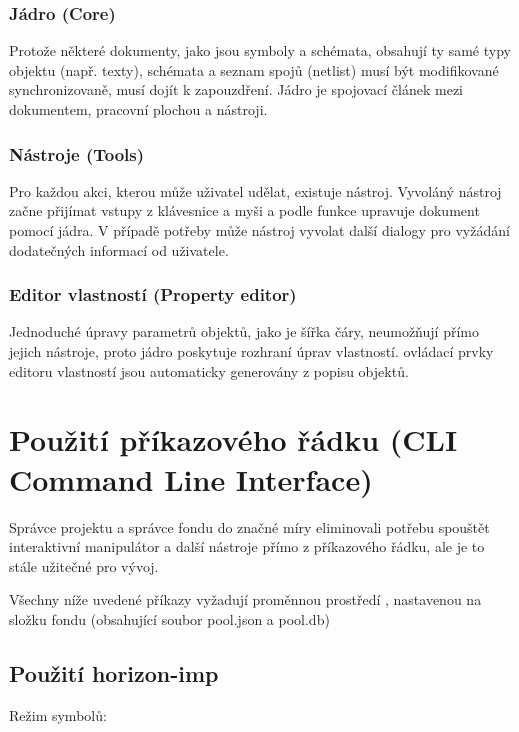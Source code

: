 \documentclass[letterpaper,10pt,czech]{sphinxmanual}
\begin{document}
\subsection{Jádro (Core)}
\label{\detokenize{theory-of-operation:jadro-core}}
Protože některé dokumenty, jako jsou symboly a schémata, obsahují ty samé
typy objektu (např. texty), schémata a seznam spojů (netlist) musí být
modifikované synchronizovaně, musí dojít k zapouzdření. Jádro je
spojovací článek mezi dokumentem, pracovní plochou a nástroji.


\subsection{Nástroje (Tools)}
\label{\detokenize{theory-of-operation:nastroje-tools}}
Pro každou akci, kterou může uživatel udělat, existuje nástroj. Vyvoláný nástroj začne
přijímat vstupy z klávesnice a myši a podle funkce upravuje dokument
pomocí jádra. V případě potřeby může nástroj vyvolat další
dialogy pro vyžádání dodatečných informací od uživatele.


\subsection{Editor vlastností (Property editor)}
\label{\detokenize{theory-of-operation:editor-vlastnosti-property-editor}}
Jednoduché úpravy parametrů objektů, jako je šířka čáry, neumožňují přímo jejich nástroje,
proto jádro poskytuje rozhraní úprav vlastností.
ovládací prvky editoru vlastností jsou automaticky generovány z popisu objektů.


\chapter{Použití příkazového řádku (CLI Command Line Interface)}
\label{\detokenize{cli-usage:pouziti-prikazoveho-radku-cli-command-line-interface}}\label{\detokenize{cli-usage::doc}}
Správce projektu a správce fondu do značné míry eliminovali potřebu
spouštět interaktivní manipulátor a další nástroje přímo z příkazového řádku,
ale je to stále užitečné pro vývoj.

Všechny níže uvedené příkazy vyžadují proměnnou prostředí
, nastavenou na složku fondu (obsahující soubor pool.json a pool.db)


\section{Použití horizon-imp}
\label{\detokenize{cli-usage:pouziti-horizon-imp}}
\begin{DUlineblock}{0em}
\item[] Režim symbolů:
\item[] 
\end{DUlineblock}
\end{document}
